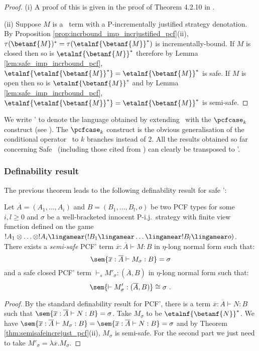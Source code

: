 \begin{proof}
\noindent(i)
A proof of this is given in the proof of Theorem 4.2.10 in \cite{blumtransfer}.

\noindent(ii) Suppose $M$ is a \pcf\ term with a P-incrementally
justified strategy denotation. By Proposition
\ref{prop:incrbound_imp_incrjustified_pcf}(ii), $\tau(\betanf{M})^*
= \tau(\etalnf{\betanf{M}}^*)$ is incrementally-bound. If $M$ is
closed then so is $\etalnf{\betanf{M}}^*$ therefore by Lemma
\ref{lem:safe_imp_incrbound_pcf}, $\etalnf{\etalnf{\betanf{M}}^*} =
\etalnf{\betanf{M}}^*$ is safe. If $M$ is open then so is
$\etalnf{\betanf{M}}^*$ and by Lemma
\ref{lem:safe_imp_incrbound_pcf}, $\etalnf{\etalnf{\betanf{M}}^*} =
\etalnf{\betanf{M}}^*$ is semi-safe.
\end{proof}


We write \pcf' to denote the language obtained by extending \pcf\
with the $\pcfcase_k$ construct (see \cite{Abr02}).
The $\pcfcase_k$ construct is the obvious generalisation of the
conditional operator \pcfcond\ to $k$ branches instead of $2$. All the results obtained so far concerning Safe \pcf\ (including those
cited from \cite{blumtransfer}) can clearly be transposed to \pcf'.

\subsubsection{Definability result}

The previous theorem leads to the following definability result for safe \pcf':
\begin{proposition}
\label{prop:safetydefinability} Let $\overline{A}=(A_1,\ldots, A_i)$
and $B =(B_1, \ldots, B_l,o)$ be two PCF types for some $i,l\geq 0$
and $\sigma$ be a well-bracketed innocent P-i.j.\ strategy with
finite view function defined on the game $!A_1 \otimes \ldots
\otimes !A_i \lingamear (!B_1 \lingamear \ldots \lingamear !B_l
\lingamear o) $. There exists a \emph{semi-safe} PCF' term
$\overline{x} : \overline{A} \vdash M : B$ in $\eta$-long normal
form such that:
$$ \sem{\overline{x} : \overline{A} \vdash M_\sigma : B} = \sigma $$
and a safe closed PCF' term $\vdash_s M'_\sigma : (\overline{A},B)$ in $\eta$-long normal form such that:
$$ \sem{\vdash M'_\sigma : (\overline{A},B)} \cong \sigma \ .$$
\end{proposition}
\begin{proof}
By the standard definability result for PCF', there is a term
$\overline{x} : \overline{A} \vdash N : B$ such that
$\sem{\overline{x} :\overline{A} \vdash N : B} = \sigma$. Take
$M_\sigma$ to be $\etalnf{\betanf{N}}^* $. We have
$\sem{\overline{x} : \overline{A} \vdash M_\sigma : B} =
\sem{\overline{x} :\overline{A} \vdash N : B} = \sigma$ and by
Theorem  \ref{thm:semisafeincrejust_pcf}(ii), $M_\sigma$ is
semi-safe. For the second part we just need to take $M'_\sigma =
\lambda \overline{x}. M_\sigma$.
\end{proof}



